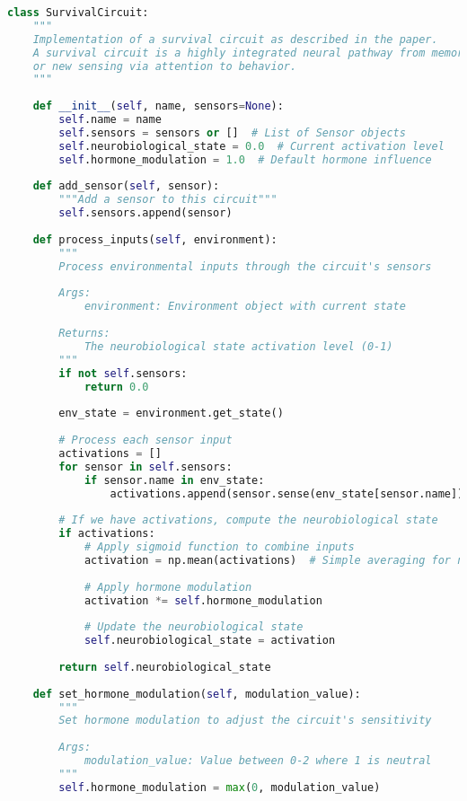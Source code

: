 \documentclass[11pt,a4paper]{article}
\begin{document}
\begin{lstlisting}[language=Python]
class SurvivalCircuit:
    """
    Implementation of a survival circuit as described in the paper.
    A survival circuit is a highly integrated neural pathway from memory 
    or new sensing via attention to behavior.
    """
    
    def __init__(self, name, sensors=None):
        self.name = name
        self.sensors = sensors or []  # List of Sensor objects
        self.neurobiological_state = 0.0  # Current activation level
        self.hormone_modulation = 1.0  # Default hormone influence
        
    def add_sensor(self, sensor):
        """Add a sensor to this circuit"""
        self.sensors.append(sensor)
        
    def process_inputs(self, environment):
        """
        Process environmental inputs through the circuit's sensors
        
        Args:
            environment: Environment object with current state
        
        Returns:
            The neurobiological state activation level (0-1)
        """
        if not self.sensors:
            return 0.0
            
        env_state = environment.get_state()
        
        # Process each sensor input
        activations = []
        for sensor in self.sensors:
            if sensor.name in env_state:
                activations.append(sensor.sense(env_state[sensor.name]))
        
        # If we have activations, compute the neurobiological state
        if activations:
            # Apply sigmoid function to combine inputs 
            activation = np.mean(activations)  # Simple averaging for now
            
            # Apply hormone modulation
            activation *= self.hormone_modulation
            
            # Update the neurobiological state
            self.neurobiological_state = activation
            
        return self.neurobiological_state
    
    def set_hormone_modulation(self, modulation_value):
        """
        Set hormone modulation to adjust the circuit's sensitivity
        
        Args:
            modulation_value: Value between 0-2 where 1 is neutral
        """
        self.hormone_modulation = max(0, modulation_value)
\end{lstlisting}
\end{document}
